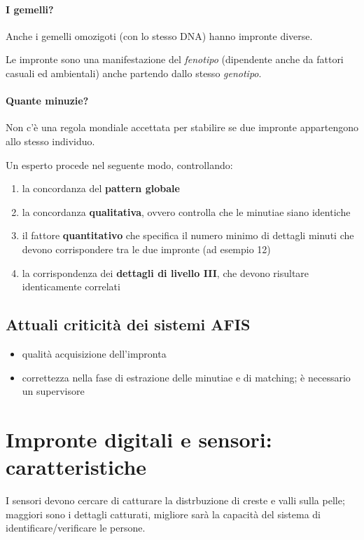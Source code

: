 \documentclass{report}
\begin{document}
\subsubsection{I gemelli?}

Anche i gemelli omozigoti (con lo stesso DNA) hanno impronte diverse.

\noindent Le impronte sono una manifestazione del \textit{fenotipo} (dipendente anche da fattori casuali ed 
ambientali) anche partendo dallo stesso \textit{genotipo}.

\subsubsection{Quante minuzie?}
Non c'è una regola mondiale accettata per stabilire se due impronte appartengono allo stesso
individuo.

Un esperto procede nel seguente modo, controllando:
\begin{enumerate}
    \item la concordanza del \textbf{pattern globale}
    \item la concordanza \textbf{qualitativa}, ovvero controlla che le minutiae siano identiche
    \item il fattore \textbf{quantitativo} che specifica il numero minimo di dettagli minuti che
    devono corrispondere tra le due impronte (ad esempio 12)
    \item la corrispondenza dei \textbf{dettagli di livello III}, che devono risultare identicamente correlati
\end{enumerate}

\section{Attuali criticità dei sistemi AFIS}

\begin{itemize}
    \item qualità acquisizione dell'impronta
    \item correttezza nella fase di estrazione delle minutiae e di matching; è necessario un supervisore
\end{itemize}

\chapter{Impronte digitali e sensori: caratteristiche}


I sensori devono cercare di catturare la distrbuzione di creste e valli sulla pelle;
maggiori sono i dettagli catturati, migliore sarà la capacità del sistema di 
identificare/verificare le persone.
\end{document}
